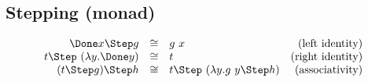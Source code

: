 \subsection{Stepping (monad)}

\begin{equation*}
  \begin{array}{rclr}
    \Done x \Step g
      &\cong& g\ x
      & \text{(left identity)} \\
    t \Step\ (\lambda y. \Done y)
      &\cong& t
      & \text{(right identity)} \\
    (t \Step g) \Step h
      &\cong& t \Step\ (\lambda y. g\ y \Step h)
      & \text{(associativity)}
  \end{array}
\end{equation*}
